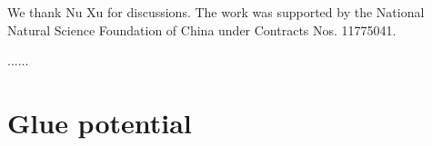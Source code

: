 \documentclass[%
reprint,
superscriptaddress,
showpacs,preprintnumbers,
 amsmath,amssymb,
 aps,
prd,
]{revtex4-1}
\begin{document}

\begin{acknowledgments}

We thank Nu Xu for discussions. The work was supported by the National Natural Science Foundation of China under Contracts Nos. 11775041.

......

\end{acknowledgments}


\appendix

\section{Glue potential}
\label{app:gluepot}
\end{document}
